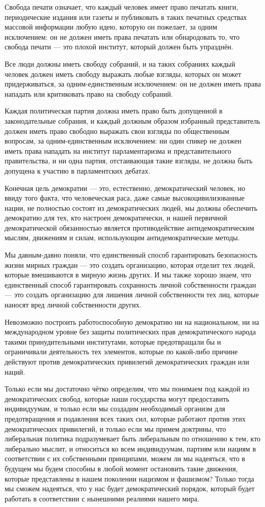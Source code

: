 Свобода печати означает, что каждый человек имеет право печатать книги, периодические издания или газеты и публиковать в таких печатных средствах массовой информации любую идею, которую он пожелает, за одним исключением: он не должен иметь права печатать или обнародовать то, что свобода печати — это плохой институт, который должен быть упразднён.

Все люди должны иметь свободу собраний, и на таких собраниях каждый человек должен иметь свободу выражать любые взгляды, которых он может придерживаться, за одним-единственным исключением: он не должен иметь права нападать или критиковать право на свободу собраний.

Каждая политическая партия должна иметь право быть допущенной в законодательные собрания, и каждый должным образом избранный представитель должен иметь право свободно выражать свои взгляды по общественным вопросам, за одним-единственным исключением: ни один спикер не должен иметь права нападать на институт парламентаризма и представительного правительства, и ни одна партия, отстаивающая такие взгляды, не должна быть допущена к участию в парламентских дебатах.

Конечная цель демократии — это, естественно, демократический человек, но ввиду того факта, что человеческая раса, даже самые высокоцивилизованные нации, не полностью состоят из демократических людей, мы должны обеспечить демократию для тех, кто настроен демократически, и нашей первичной демократической обязанностью является противодействие антидемократическим мыслям, движениям и силам, использующим антидемократические методы.

Мы давным-давно поняли, что единственный способ гарантировать безопасность жизни мирных граждан — это создать организацию, которая отделит тех людей, которые вмешиваются в мирную жизнь других. И мы также хорошо знаем, что единственный способ гарантировать сохранность личной собственности граждан — это создать организацию для лишения личной собственности тех лиц, которые наносят вред личной собственности других.

Невозможно построить работоспособную демократию ни на национальном, ни на международном уровне без защиты политических прав демократического народа такими принудительными институтами, которые предотвращали бы и ограничивали деятельность тех элементов, которые по какой-либо причине действуют против демократических привилегий демократических граждан или наций.

Только если мы достаточно чётко определим, что мы понимаем под каждой из демократических свобод, которые наши государства могут предоставить индивидуумам, и только если мы создадим необходимый организм для предотвращения и подавления всех таких сил, которые работают против этих демократических привилегий, и только если мы примем доктрины, что либеральная политика подразумевает быть либеральным по отношению к тем, кто либерально мыслит, и относиться ко всем индивидуумам, партиям или нациям в соответствии с их собственными принципами, можем ли мы надеяться, что в будущем мы будем способны в любой момент остановить такие движения, которые представлены в нашем поколении нацизмом и фашизмом? Только тогда мы сможем надеяться, что у нас будет демократический порядок, который будет работать в соответствии с нынешними реалиями нашего мира.
